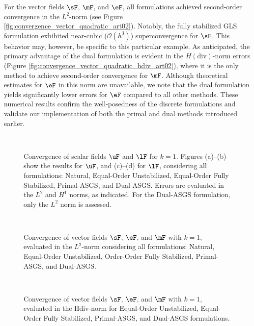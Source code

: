 For the vector fields $\sF$, $\mF$, and $\eF$, all formulations achieved second-order convergence in the $L^2$-norm (see Figure \ref{fig:convergence_vector_quadratic_art02}). Notably, the fully stabilized GLS formulation exhibited near-cubic ($\mathcal{O}(h^3)$) superconvergence for $\sF$. This behavior may, however, be specific to this particular example. As anticipated, the primary advantage of the dual formulation is evident in the $H(\text{div})$-norm errors (Figure \ref{fig:convergence_vector_quadratic_hdiv_art02}), where it is the only method to achieve second-order convergence for $\mF$. Although theoretical estimates for $\eF$ in this norm are unavailable, we note that the dual formulation yields significantly lower errors for $\eF$ compared to all other methods.
These numerical results confirm the well-posedness of the discrete formulations and validate our implementation of both the primal and dual methods introduced earlier.


\begin{figure}[h!]
	\centering
	\caption{Convergence of scalar fields $\uF$ and $\lF$ for $k = 1$. Figures (a)--(b) show the results for $\uF$, and (c)--(d) for $\lF$, considering all formulations: Natural, Equal-Order Unstabilized, Equal-Order Fully Stabilized, Primal-ASGS, and Dual-ASGS. Errors are evaluated in the $L^2$ and $H^1$ norms, as indicated. For the Dual-ASGS formulation, only the $L^2$ norm is assessed.}
		~\\
	\def\svgwidth{1.0\columnwidth}
	
	\label{fig:convergence_scalar_linear_art02}
\end{figure}


\begin{figure}[h!]
	\centering
	\caption{Convergence of vector fields $\sF$, $\eF$, and $\mF$ with $k=1$, evaluated in the $L^{2}$-norm considering all formulations: Natural, Equal-Order Unstabilized, Order-Order Fully Stabilized, Primal-ASGS, and Dual-ASGS.
	}
	~\\
	\def\svgwidth{1.0\columnwidth}
	
	\label{fig:convergence_vector_linear_art02}
\end{figure}


\begin{figure}[h!]
	\centering
	\caption{Convergence of vector fields $\sF$, $\eF$, and $\mF$ with $k=1$, evaluated in the Hdiv-norm for Equal-Order Unstabilized, Equal-Order Fully Stabilized, Primal-ASGS, and Dual-ASGS formulations.
	}
	~\\
	\def\svgwidth{1.0\columnwidth}
	
	\label{fig:convergence_vector_linear_hdiv_art02}
\end{figure}


